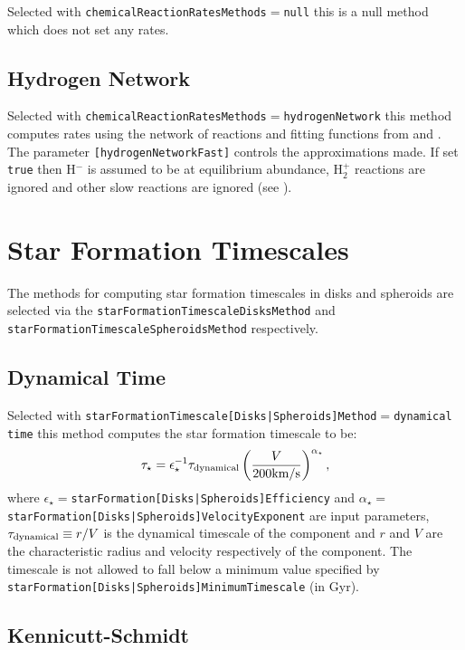 Selected with {\tt chemicalReactionRatesMethods}$=${\tt null} this is a null method which does not set any rates.

\subsection{Hydrogen Network}

Selected with {\tt chemicalReactionRatesMethods}$=${\tt hydrogenNetwork} this method computes rates using the network of reactions and fitting functions from \cite{abel_modeling_1997} and \cite{tegmark_small_1997}. The parameter {\tt [hydrogenNetworkFast]} controls the approximations made. If set {\tt true} then H$^-$ is assumed to be at equilibrium abundance, H$_2^+$ reactions are ignored and other slow reactions are ignored (see \citealt{abel_modeling_1997}).

\section{Star Formation Timescales}

The methods for computing star formation timescales in disks and spheroids are selected via the {\tt starFormationTimescaleDisksMethod} and {\tt starFormationTimescaleSpheroidsMethod} respectively.

\subsection{Dynamical Time}

Selected with {\tt starFormationTimescale[Disks|Spheroids]Method}$=${\tt dynamical time} this method computes the star formation timescale to be:
\begin{equation}
 \tau_\star = \epsilon_\star^{-1} \tau_{\rm dynamical} \left( {V \over 200\hbox{km/s}} \right)^{\alpha_\star},
\end{equation}
where $\epsilon_\star=${\tt starFormation[Disks|Spheroids]Efficiency} and $\alpha_\star=${\tt starFormation[Disks|Spheroids]VelocityExponent} are input parameters, $\tau_{\rm dynamical}\equiv r/V$ is the dynamical timescale of the component and $r$ and $V$ are the characteristic radius and velocity respectively of the component. The timescale is not allowed to fall below a minimum value specified by {\tt starFormation[Disks|Spheroids]MinimumTimescale} (in Gyr).

\subsection{Kennicutt-Schmidt}\label{sec:StarFormationKennicuttSchmidt}

